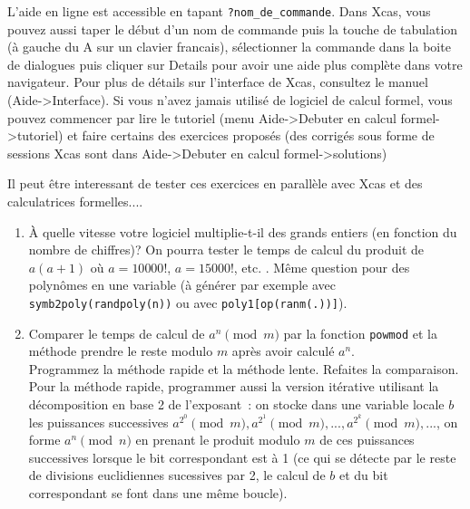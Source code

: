\documentclass[a4paper,11pt]{article}
\begin{document}
\begin{giacjshere}

L'aide en ligne est accessible en tapant \verb|?nom_de_commande|.
Dans Xcas, vous pouvez aussi taper le d\'ebut d'un
nom de commande puis la touche de tabulation (\`a gauche du A sur
un clavier francais), s\'electionner la commande dans la boite
de dialogues puis cliquer sur Details pour avoir une aide plus
compl\`ete dans votre navigateur. Pour plus de d\'etails sur
l'interface de Xcas, consultez le manuel (Aide->Interface).
Si vous n'avez jamais utilis\'e de logiciel de calcul formel,
vous pouvez commencer par lire le tutoriel (menu Aide->Debuter en
calcul formel->tutoriel) et faire certains des exercices 
propos\'es (des corrig\'es sous forme de sessions Xcas sont 
dans Aide->Debuter en calcul formel->solutions)

Il peut \^etre interessant de tester ces exercices
en parall\`ele avec Xcas et des calculatrices
formelles....

\begin{enumerate}
\item \`A quelle vitesse votre logiciel multiplie-t-il des
grands entiers (en fonction du nombre de chiffres)? 
On pourra tester le temps de calcul du produit
de $a(a+1)$ o\`u $a=10 000!$, $a=15000!$, etc. .
M\^eme question pour des polyn\^omes en une variable (\`a g\'en\'erer
par exemple avec \verb|symb2poly(randpoly(n))| ou avec \verb|poly1[op(ranm(.))]|).
\item Comparer le temps de calcul de $a^n \pmod m$ par la fonction
\verb|powmod| et la m\'ethode prendre le reste modulo $m$ apr\`es avoir 
calcul\'e $a^n$.\\
Programmez la m\'ethode rapide et la m\'ethode lente.
Refaites la
comparaison. Pour la m\'ethode rapide, programmer aussi la version
it\'erative utilisant la d\'ecomposition en base 2 de l'exposant~:
on stocke dans une variable locale $b$ les puissances successives
$a^{2^0} \pmod m,a^{2^1} \pmod m, ..., a^{2^k} \pmod m, ...$,
on forme $a^n \pmod n$ en prenant le produit modulo $m$ de ces puissances
successives lorsque le bit correspondant est \`a 1 (ce qui se
d\'etecte par le reste de divisions euclidiennes sucessives par 2, le
calcul de $b$ et du bit correspondant se font dans une m\^eme boucle).


\end{enumerate}
\end{giacjshere}
\end{document}
